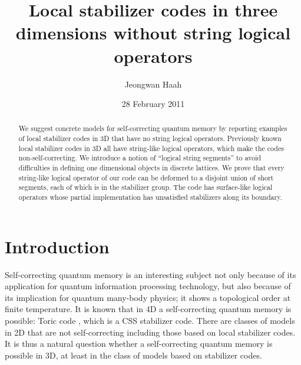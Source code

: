 \documentclass[letterpaper,10pt,pra,aps,showpacs,twocolumn]{revtex4-1}
\theoremstyle{definition} \newtheorem{defn}{Definition}
\theoremstyle{definition} \newtheorem{remark}{Remark}
\begin{document}
\title{Local stabilizer codes in three dimensions without string logical operators}
\author{Jeongwan Haah}
\date{28 February 2011}

\begin{abstract}
We suggest concrete models for self-correcting quantum memory by reporting examples of local stabilizer codes in 3D that have no string logical operators.
Previously known local stabilizer codes in 3D all have string-like logical operators, which make the codes non-self-correcting.
We introduce a notion of ``logical string segments'' to avoid difficulties in defining one dimensional objects in discrete lattices.
We prove that every string-like logical operator of our code can be deformed to a disjoint union of short segments, each of which is in the stabilizer group. The code has surface-like logical operators whose partial implementation has unsatisfied stabilizers along its boundary.
\end{abstract}

\maketitle

\section{Introduction}

Self-correcting quantum memory is an interesting subject not only because of its application for quantum information processing technology, but also because of its implication for quantum many-body physics; it shows a topological order at finite temperature. 
It is known that in 4D a self-correcting quantum memory is possible: Toric code \cite{DennisKitaevLandahlEtAl2002Topological, AlickiHorodeckiHorodeckiEtAl2008thermal}, which is a CSS stabilizer code. There are classes of models in 2D that are not self-correcting \cite{BravyiTerhal2008no-go, KayColbeck2008Quantum, HaahPreskill2010Logical} including those based on local stabilizer codes. It is thus a natural question whether a self-correcting quantum memory is possible in 3D, at least in the class of models based on stabilizer codes.
\end{document}
